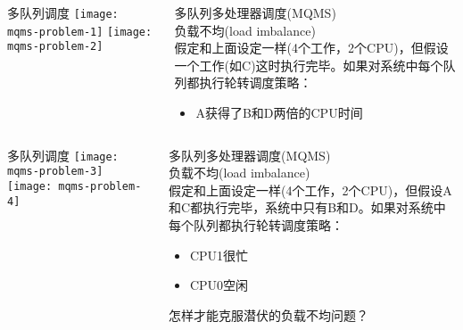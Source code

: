 \begin{frame}
	\begin{columns}
		\begin{column}{.5\textwidth}
			\Large \centering
			多队列调度
			\texttt{[image: mqms-problem-1]}
			\texttt{[image: mqms-problem-2]}	
		\end{column}
		
		\begin{column}{.5\textwidth}
			\large
			多队列多处理器调度(MQMS) \\
			负载不均(load imbalance) \\ 
			\normalsize
			假定和上面设定一样(4个工作，2个CPU)，但假设一个工作(如C)这时执行完毕。如果对系统中每个队列都执行轮转调度策略：
			
			\begin{itemize}
				\item A获得了B和D两倍的CPU时间

			\end{itemize}
		\end{column}
	\end{columns}
\end{frame}



\begin{frame}
	\begin{columns}
		\begin{column}{.5\textwidth}
			\Large \centering
			多队列调度
			\texttt{[image: mqms-problem-3]}
			\texttt{[image: mqms-problem-4]}	
		\end{column}
		
		\begin{column}{.5\textwidth}
			\large
			多队列多处理器调度(MQMS) \\
			负载不均(load imbalance) \\ 
			\normalsize
			假定和上面设定一样(4个工作，2个CPU)，但假设A和C都执行完毕，系统中只有B和D。如果对系统中每个队列都执行轮转调度策略：
			
			\begin{itemize}
				\item CPU1很忙
				\item CPU0空闲
				
			\end{itemize}
		\Large
		怎样才能克服潜伏的负载不均问题？
		\end{column}
	\end{columns}
\end{frame}



